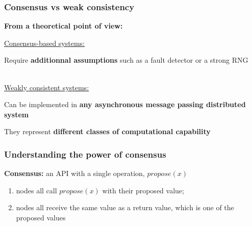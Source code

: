 \documentclass[aspectratio=169]{beamer}
\begin{document}
\begin{frame}
	\frametitle{Consensus vs weak consistency}
	\begin{center}
		\textbf{From a theoretical point of view:}\\

	\end{center}
	\vspace{2em}

	\hspace{1em}
	\begin{minipage}{6.5cm}
		\underline{Consensus-based systems:}

		\vspace{1em}

		Require \textbf{additionnal assumptions} such as a fault detector or a strong RNG\\~
	\end{minipage}
	\hfill
	\begin{minipage}{6.5cm}
		\underline{Weakly consistent systems:}

		\vspace{1em}
		
		Can be implemented in \textbf{any asynchronous message passing distributed system}
	\end{minipage}
	\hspace{1em}

	\vspace{3em}
	\begin{center}
		They represent \textbf{different classes of computational capability}
	\end{center}
\end{frame}

\begin{frame}
	\frametitle{Understanding the power of consensus}
	\textbf{Consensus:} an API with a single operation, $propose(x)$
	\begin{enumerate}
		\item nodes all call $propose(x)$ with their proposed value;
		\item nodes all receive the same value as a return value, which is one of the proposed values
	\end{enumerate}
	\vspace{1em}
	
	\vspace{1em}

\end{frame}
\end{document}
